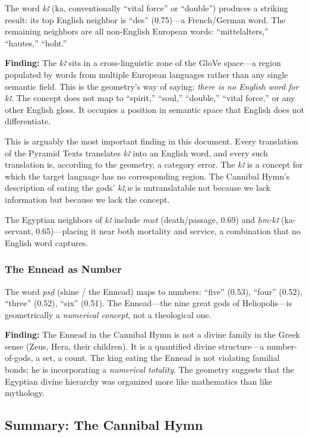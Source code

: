 \documentclass[11pt, a4paper]{article}
\begin{document}
The word \textit{kꜣ} (ka, conventionally ``vital force'' or ``double'') produces a striking result: its top English neighbor is ``des'' (0.75)---a French/German word. The remaining neighbors are all non-English European words: ``mittelalters,'' ``hautes,'' ``hoht.''

{\color{insight}\textbf{Finding:}} The \textit{kꜣ} sits in a cross-linguistic zone of the GloVe space---a region populated by words from multiple European languages rather than any single semantic field. This is the geometry's way of saying: \textit{there is no English word for \textit{kꜣ}}. The concept does not map to ``spirit,'' ``soul,'' ``double,'' ``vital force,'' or any other English gloss. It occupies a position in semantic space that English does not differentiate.

This is arguably the most important finding in this document. Every translation of the Pyramid Texts translates \textit{kꜣ} into an English word, and every such translation is, according to the geometry, a category error. The \textit{kꜣ} is a concept for which the target language has no corresponding region. The Cannibal Hymn's description of eating the gods' \textit{kꜣ,w} is untranslatable not because we lack information but because we lack the concept.

The Egyptian neighbors of \textit{kꜣ} include \textit{mwt} (death/passage, 0.69) and \textit{ḥm-kꜣ} (ka-servant, 0.65)---placing it near both mortality and service, a combination that no English word captures.

\subsubsection{The Ennead as Number}

The word \textit{psḏ} (shine / the Ennead) maps to numbers: ``five'' (0.53), ``four'' (0.52), ``three'' (0.52), ``six'' (0.51). The Ennead---the nine great gods of Heliopolis---is geometrically a \textit{numerical concept}, not a theological one.

{\color{insight}\textbf{Finding:}} The Ennead in the Cannibal Hymn is not a divine family in the Greek sense (Zeus, Hera, their children). It is a quantified divine structure---a number-of-gods, a set, a count. The king eating the Ennead is not violating familial bonds; he is incorporating a \textit{numerical totality}. The geometry suggests that the Egyptian divine hierarchy was organized more like mathematics than like mythology.

\subsection{Summary: The Cannibal Hymn}
\end{document}
